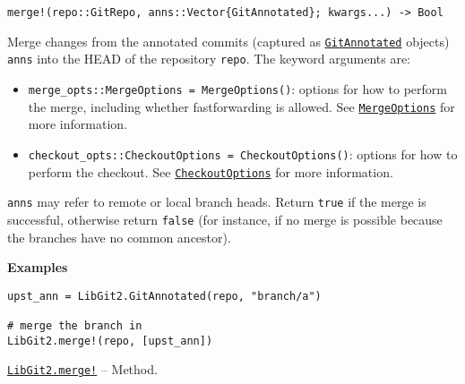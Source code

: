 \begin{adjustwidth}{2em}{0pt}


\begin{verbatim}
merge!(repo::GitRepo, anns::Vector{GitAnnotated}; kwargs...) -> Bool
\end{verbatim}

Merge changes from the annotated commits (captured as \hyperlink{9263689983564368210}{\texttt{GitAnnotated}} objects) \texttt{anns} into the HEAD of the repository \texttt{repo}. The keyword arguments are:

\begin{itemize}
\item \texttt{merge\_opts::MergeOptions = MergeOptions()}: options for how to perform the merge, including whether fastforwarding is allowed. See \hyperlink{7663922722360889557}{\texttt{MergeOptions}} for more information.


\item \texttt{checkout\_opts::CheckoutOptions = CheckoutOptions()}: options for how to perform the checkout. See \hyperlink{16441061243067746546}{\texttt{CheckoutOptions}} for more information.

\end{itemize}
\texttt{anns} may refer to remote or local branch heads. Return \texttt{true} if the merge is successful, otherwise return \texttt{false} (for instance, if no merge is possible because the branches have no common ancestor).

\textbf{Examples}


\begin{verbatim}
upst_ann = LibGit2.GitAnnotated(repo, "branch/a")

# merge the branch in
LibGit2.merge!(repo, [upst_ann])
\end{verbatim}



\end{adjustwidth}
\hypertarget{4685130166334465369}{} 
\hyperlink{4685130166334465369}{\texttt{LibGit2.merge!}}  -- {Method.}

